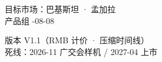 {\begin{titlepage}
  \vfill

  \noindent{\color{brand!55}\rule{\textwidth}{0.7pt}}

  \vspace{8pt}
  \noindent\begin{minipage}{0.5\textwidth}
    \small\color{midgray}
    目标市场：巴基斯坦 · 孟加拉\\
    产品组 -08-08
  \end{minipage}\hfill
  \begin{minipage}{0.48\textwidth}
    \raggedleft\small\color{midgray}
    版本 V1.1（RMB 计价 · 压缩时间线）\\
    死线：2026-11 广交会样机 / 2027-04 上市
  \end{minipage}
\end{titlepage}}

\setcounter{tocdepth}{2}
